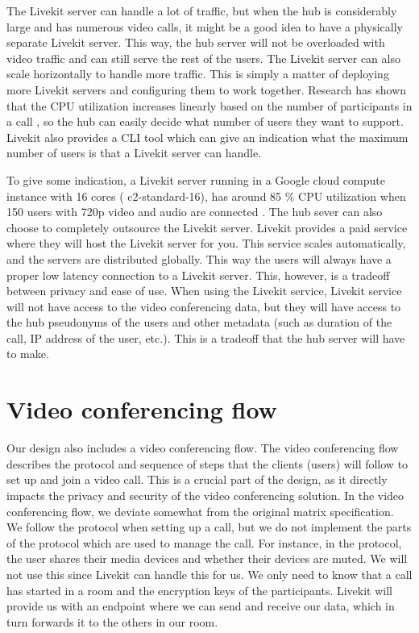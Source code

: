 \documentclass{report}
\begin{document}
The Livekit server can handle a lot of traffic, but when the hub is considerably large and has numerous video calls, it
might be a good idea to have a physically separate Livekit server. This way, the hub server will not be overloaded with
video traffic and can still serve the rest of the users. The Livekit server can also scale horizontally to handle
more traffic. This is simply a matter of deploying more Livekit servers and configuring them to work together.
Research has shown that the CPU utilization increases linearly based on the number of participants in a call
\cite{muscariello_securing_2023}, so the hub can easily decide what number of users they want to
support. Livekit also provides a CLI tool which can give an indication what the maximum number of users is that a
Livekit server can handle.


To give some indication, a Livekit server running in a Google cloud compute instance with 16 cores (
c2-standard-16), has around 85 \% CPU utilization when 150 users with 720p video and audio are connected
\cite{noauthor_benchmarking_nodate}. The hub sever can also choose to completely outsource the Livekit server.
Livekit provides a paid service where they will host the Livekit server for you. This service scales
automatically, and the servers are distributed globally. This way the users will always have a proper low
latency connection to a Livekit server. This, however, is a tradeoff between privacy and ease of use. When using
the Livekit service, Livekit service will not have access to the video conferencing data, but they will have access to
the hub pseudonyms of the users and other metadata (such as duration of the call, IP address of the user, etc.). This
is a tradeoff that the hub server will have to make.

\section{Video conferencing flow}
Our design also includes a video conferencing flow. The video conferencing flow describes the protocol and sequence
of steps that the clients (users) will follow to set up and join a video call.
This is a crucial part of the design, as it directly impacts the privacy and security of the video conferencing solution.
In the video conferencing flow, we deviate somewhat from the original matrix specification. We follow the protocol
when setting up a call, but we do not implement the parts of the protocol which are used to manage the call. For
instance, in the protocol, the user shares their media devices and whether their devices are muted. We will not use
this since Livekit can handle this for us. We only need to know that a call has started in a room and the encryption
keys of the participants. Livekit will provide us with an endpoint where we can send and receive our data, which in
turn forwards it to the others in our room.
\end{document}
